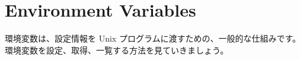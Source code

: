\section{Environment Variables}

環境変数は、設定情報を Unix プログラムに渡すための、一般的な仕組みです。環境変数を設定、取得、一覧する方法を見ていきましょう。




